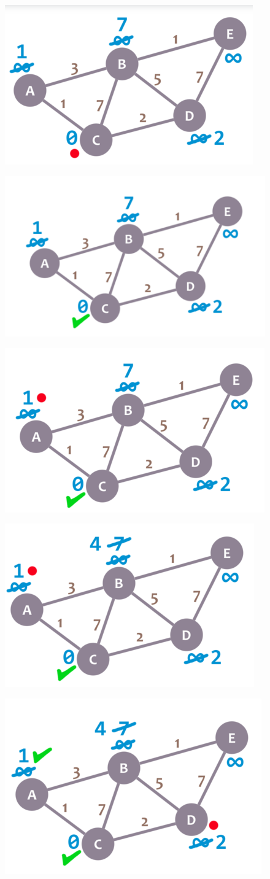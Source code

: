 \documentclass[12pt ,a4paper]{exam}
\begin{document}
\begin{enumerate}[start=1,label={\bfseries Q\arabic*)}]
    	\begin{figure}[h!]
    		\centering
    		\includegraphics[width=0.3\linewidth]{"Screenshot 2020-12-27 at 10.04.09 PM"}
    		\caption{}
    		\label{fig:screenshot-2020-12-27-at-10}
    	\end{figure}
    	\begin{figure}[h!]
    		\centering
    		\includegraphics[width=0.3\linewidth]{"Screenshot 2020-12-27 at 10.04.15 PM"}
    		\caption{}
    		\label{fig:screenshot-2020-12-27-at-10}
    	\end{figure}
       \pagebreak
    	\begin{figure}[h!]
    		\centering
    		\includegraphics[width=0.3\linewidth]{"Screenshot 2020-12-27 at 10.04.21 PM"}
    		\caption{}
    		\label{fig:screenshot-2020-12-27-at-10}
    	\end{figure}
    	\begin{figure}[h!]
    		\centering
    		\includegraphics[width=0.3\linewidth]{"Screenshot 2020-12-27 at 10.04.28 PM"}
    		\caption{}
    		\label{fig:screenshot-2020-12-27-at-10}
    	\end{figure}
    	\begin{figure}[h!]
    		\centering
    		\includegraphics[width=0.3\linewidth]{"Screenshot 2020-12-27 at 10.04.34 PM"}

\end{figure}
\end{enumerate}
\end{document}
